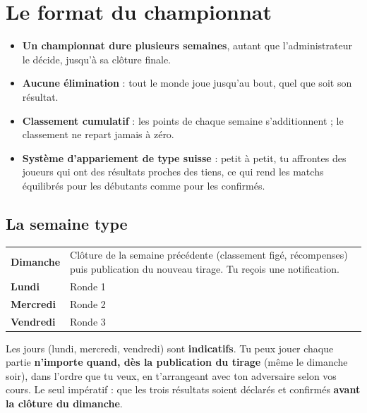 \documentclass[11pt,a4paper]{article}
\begin{document}
\section{Le format du championnat}
\begin{itemize}
  \item \textbf{Un championnat dure plusieurs semaines}, autant que l'administrateur le décide, jusqu'à sa clôture finale.
  \item \textbf{Aucune élimination} : tout le monde joue jusqu'au bout, quel que soit son résultat.
  \item \textbf{Classement cumulatif} : les points de chaque semaine s'additionnent ; le classement ne repart jamais à zéro.
  \item \textbf{Système d'appariement de type suisse} : petit à petit, tu affrontes des joueurs qui ont des résultats proches
        des tiens, ce qui rend les matchs équilibrés pour les débutants comme pour les confirmés.
\end{itemize}

\subsection{La semaine type}
\begin{center}
\renewcommand{\arraystretch}{1.35}
\begin{tabularx}{0.92\linewidth}{>{\bfseries\color{nuit}}l X}
\toprule
\rowcolor{orclair!25}Dimanche & Clôture de la semaine précédente (classement figé, récompenses) puis publication du nouveau tirage. Tu reçois une notification. \\
Lundi    & Ronde 1 \\
Mercredi & Ronde 2 \\
Vendredi & Ronde 3 \\
\bottomrule
\end{tabularx}
\end{center}

\begin{aretenir}[Souplesse]
Les jours (lundi, mercredi, vendredi) sont \textbf{indicatifs}. Tu peux jouer chaque partie \textbf{n'importe quand,
dès la publication du tirage} (même le dimanche soir), dans l'ordre que tu veux, en t'arrangeant avec ton adversaire selon vos cours. Le seul impératif : que les trois résultats
soient déclarés et confirmés \textbf{avant la clôture du dimanche}.
\end{aretenir}
\end{document}
